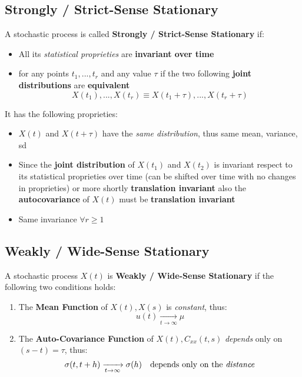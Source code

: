 \subsection{Strongly / Strict-Sense Stationary}
\begin{tcolorbox}
A stochastic process is called \textbf{Strongly / Strict-Sense Stationary} if:
\begin{itemize}
    \item All its \textit{statistical proprieties} are \textbf{invariant over time}
    \item for any points \(t_1,...,t_r\) and any value \(\tau\) if the two following \textbf{joint distributions} are \textbf{equivalent}
\[X(t_1),...,X(t_r) \equiv X(t_1 + \tau),...,X(t_r + \tau)\]
\end{itemize}
\end{tcolorbox}
It has the following proprieties:
\begin{itemize}
    \item \(X(t)\) and \(X(t + \tau)\) have the \textit{same distribution}, thus same mean, variance, sd
    \item Since the \textbf{joint distribution} of \(X(t_1)\) and \(X(t_2)\) is invariant respect to its statistical proprieties over time (can be shifted over time with no changes in proprieties) or more shortly \textbf{translation invariant} also the \textbf{autocovariance} of \(X(t)\) must be \textbf{translation invariant}
    \item Same invariance \(\forall r \geq 1\)
\end{itemize}

\subsection{Weakly / Wide-Sense Stationary}
\begin{tcolorbox}
A stochastic process \(X(t)\) is \textbf{Weakly / Wide-Sense Stationary} if the following two conditions holds:
\begin{enumerate}
    \item The \textbf{Mean Function} of \(X(t), X(s)\) is \textit{constant}, thus:
    \[u(t) \xrightarrow[t \to \infty]{} \mu\]
    \item The \textbf{Auto-Covariance Function} of \(X(t), C_{xx}(t,s)\) \textit{depends} only on \((s - t) = \tau\), thus:
    \[\sigma(t, t+h) \xrightarrow[t \to \infty]{} \sigma(h) \quad \text{depends only on the \textit{distance}}\]
\end{enumerate}
\end{tcolorbox}


